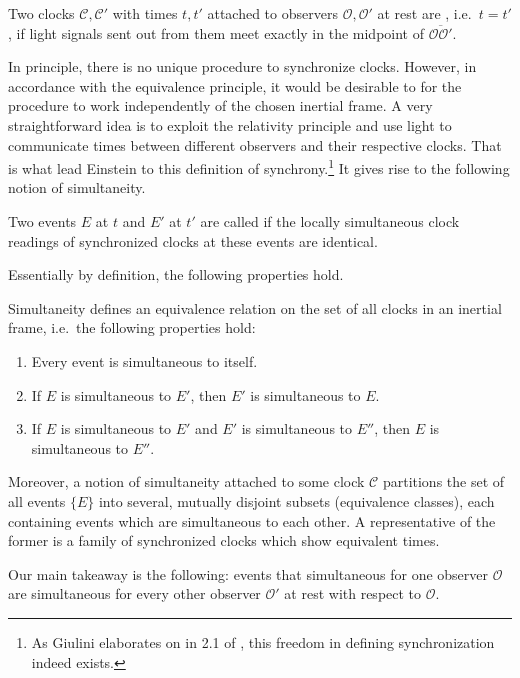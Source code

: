 \begin{defi}\label{defi:einstein_synchrony}
Two clocks $\mathcal{C}, \mathcal{C}'$ with times $t, t'$ attached to observers $\mathcal{O}, \mathcal{O}'$ at rest are , i.e.~$t = t'$, if light signals sent out from them meet exactly in the midpoint of $\overline{\mathcal{O} \mathcal{O}'}$.
\end{defi}
In principle, there is no unique procedure to synchronize clocks. However, in accordance with the equivalence principle, it would be desirable to for the procedure to work independently of the chosen inertial frame. A very straightforward idea is to exploit the relativity principle and use light to communicate times between different observers and their respective clocks. That is what lead Einstein to this definition of synchrony.\footnote{As Giulini elaborates on in 2.1 of \cite{giulini_srt}, this freedom in defining synchronization indeed exists.} It gives rise to the following notion of simultaneity.
\begin{defi}[Simultaneity]\label{defi:simultaneity}
Two events $E$ at $t$ and $E'$ at $t'$ are called  if the locally simultaneous clock readings of synchronized clocks at these events are identical.%
\end{defi}

Essentially by definition, the following properties hold.
\begin{prop}
Simultaneity defines an equivalence relation on the set of all clocks in an inertial frame, i.e.~the following properties hold:
\begin{enumerate}
\item Every event is simultaneous to itself.

\item If $E$ is simultaneous to $E'$, then $E'$ is simultaneous to $E$.

\item If $E$ is simultaneous to $E'$ and $E'$ is simultaneous to $E''$, then $E$ is simultaneous to $E''$.
\end{enumerate}

Moreover, a notion of simultaneity attached to some clock $\mathcal{C}$ partitions the set of all events $\{E\}$ into several, mutually disjoint subsets (equivalence classes), each containing events which are simultaneous to each other. A representative of the former is a family of synchronized clocks which show equivalent times.
\end{prop}
Our main takeaway is the following: events that simultaneous for one observer $\mathcal{O}$ are simultaneous for every other observer $\mathcal{O}'$ at rest with respect to $\mathcal{O}$.


